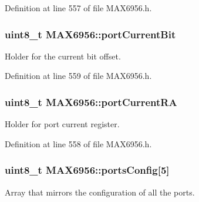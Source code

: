 Definition at line 557 of file M\-A\-X6956.\-h.

\hypertarget{classMAX6956_ad3057b6b21ae712acb0129270da63334}{
\subsubsection[{port\-Current\-Bit}]{\setlength{\rightskip}{0pt plus 5cm}uint8\-\_\-t M\-A\-X6956\-::port\-Current\-Bit\hspace{0.3cm}{\ttfamily [private]}}}\label{classMAX6956_ad3057b6b21ae712acb0129270da63334}


Holder for the current bit offset. 



Definition at line 559 of file M\-A\-X6956.\-h.

\hypertarget{classMAX6956_ab0d382db3afe7930d1b95311bfd90164}{
\subsubsection[{port\-Current\-R\-A}]{\setlength{\rightskip}{0pt plus 5cm}uint8\-\_\-t M\-A\-X6956\-::port\-Current\-R\-A\hspace{0.3cm}{\ttfamily [private]}}}\label{classMAX6956_ab0d382db3afe7930d1b95311bfd90164}


Holder for port current register. 



Definition at line 558 of file M\-A\-X6956.\-h.

\hypertarget{classMAX6956_a8b915615042c5ef96fbf3a5c260d4716}{
\subsubsection[{ports\-Config}]{\setlength{\rightskip}{0pt plus 5cm}uint8\-\_\-t M\-A\-X6956\-::ports\-Config\mbox{[}5\mbox{]}}}\label{classMAX6956_a8b915615042c5ef96fbf3a5c260d4716}
Array that mirrors the configuration of all the ports.

